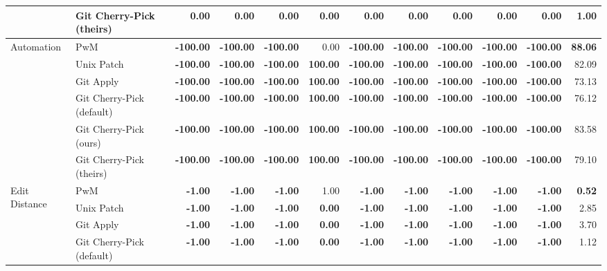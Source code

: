 \begin{tabular}{|l|l|r|r|r|r|r|r|r|r|r|r|}
 & Git Cherry-Pick (theirs) & \textbf{0.00} & \textbf{0.00} & \textbf{0.00} & \textbf{0.00} & \textbf{0.00} & \textbf{0.00} & \textbf{0.00} & \textbf{0.00} & \textbf{0.00} & \textbf{1.00} \\
\hline
\multirow{6}{*}{Automation}
 & PwM & \textbf{-100.00} & \textbf{-100.00} & \textbf{-100.00} & 0.00 & \textbf{-100.00} & \textbf{-100.00} & \textbf{-100.00} & \textbf{-100.00} & \textbf{-100.00} & \textbf{88.06} \\
 & Unix Patch & \textbf{-100.00} & \textbf{-100.00} & \textbf{-100.00} & \textbf{100.00} & \textbf{-100.00} & \textbf{-100.00} & \textbf{-100.00} & \textbf{-100.00} & \textbf{-100.00} & 82.09 \\
 & Git Apply & \textbf{-100.00} & \textbf{-100.00} & \textbf{-100.00} & \textbf{100.00} & \textbf{-100.00} & \textbf{-100.00} & \textbf{-100.00} & \textbf{-100.00} & \textbf{-100.00} & 73.13 \\
 & Git Cherry-Pick (default) & \textbf{-100.00} & \textbf{-100.00} & \textbf{-100.00} & \textbf{100.00} & \textbf{-100.00} & \textbf{-100.00} & \textbf{-100.00} & \textbf{-100.00} & \textbf{-100.00} & 76.12 \\
 & Git Cherry-Pick (ours) & \textbf{-100.00} & \textbf{-100.00} & \textbf{-100.00} & \textbf{100.00} & \textbf{-100.00} & \textbf{-100.00} & \textbf{-100.00} & \textbf{-100.00} & \textbf{-100.00} & 83.58 \\
 & Git Cherry-Pick (theirs) & \textbf{-100.00} & \textbf{-100.00} & \textbf{-100.00} & \textbf{100.00} & \textbf{-100.00} & \textbf{-100.00} & \textbf{-100.00} & \textbf{-100.00} & \textbf{-100.00} & 79.10 \\
\hline
\multirow{6}{*}{Edit Distance}
 & PwM & \textbf{-1.00} & \textbf{-1.00} & \textbf{-1.00} & 1.00 & \textbf{-1.00} & \textbf{-1.00} & \textbf{-1.00} & \textbf{-1.00} & \textbf{-1.00} & \textbf{0.52} \\
 & Unix Patch & \textbf{-1.00} & \textbf{-1.00} & \textbf{-1.00} & \textbf{0.00} & \textbf{-1.00} & \textbf{-1.00} & \textbf{-1.00} & \textbf{-1.00} & \textbf{-1.00} & 2.85 \\
 & Git Apply & \textbf{-1.00} & \textbf{-1.00} & \textbf{-1.00} & \textbf{0.00} & \textbf{-1.00} & \textbf{-1.00} & \textbf{-1.00} & \textbf{-1.00} & \textbf{-1.00} & 3.70 \\
 & Git Cherry-Pick (default) & \textbf{-1.00} & \textbf{-1.00} & \textbf{-1.00} & \textbf{0.00} & \textbf{-1.00} & \textbf{-1.00} & \textbf{-1.00} & \textbf{-1.00} & \textbf{-1.00} & 1.12 \\

\end{tabular}
